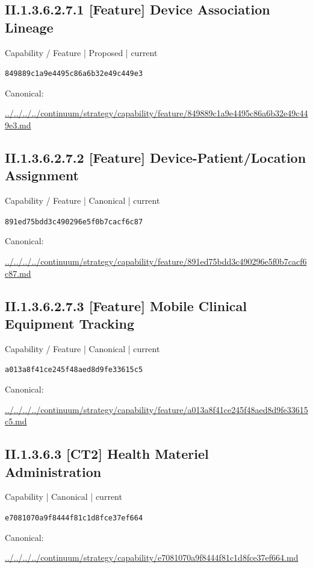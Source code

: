 \documentclass[10pt,a4paper]{article}
\begin{document}
\subsection*{II.1.3.6.2.7.1 [Feature] Device Association Lineage}
{\small Capability / Feature | Proposed | current}\par
\texttt{849889c1a9e4495c86a6b32e49c449e3}\par
Canonical: \par
{\footnotesize\url{../../../../continuum/strategy/capability/feature/849889c1a9e4495c86a6b32e49c449e3.md}}\par
\subsection*{II.1.3.6.2.7.2 [Feature] Device-Patient/Location Assignment}
{\small Capability / Feature | Canonical | current}\par
\texttt{891ed75bdd3c490296e5f0b7cacf6c87}\par
Canonical: \par
{\footnotesize\url{../../../../continuum/strategy/capability/feature/891ed75bdd3c490296e5f0b7cacf6c87.md}}\par
\subsection*{II.1.3.6.2.7.3 [Feature] Mobile Clinical Equipment Tracking}
{\small Capability / Feature | Canonical | current}\par
\texttt{a013a8f41ce245f48aed8d9fe33615c5}\par
Canonical: \par
{\footnotesize\url{../../../../continuum/strategy/capability/feature/a013a8f41ce245f48aed8d9fe33615c5.md}}\par
\subsection*{II.1.3.6.3 [CT2] Health Materiel Administration}
{\small Capability | Canonical | current}\par
\texttt{e7081070a9f8444f81c1d8fce37ef664}\par
Canonical: \par
{\footnotesize\url{../../../../continuum/strategy/capability/e7081070a9f8444f81c1d8fce37ef664.md}}\par
\end{document}
